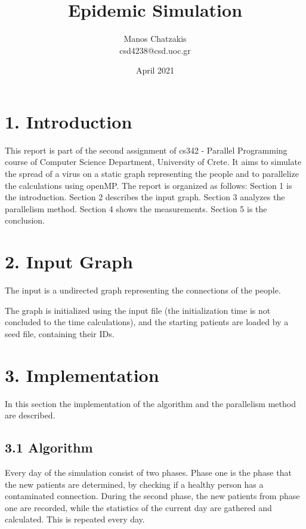 \documentclass{article}
\title{\vspace{-2.0cm}\textbf{Epidemic Simulation}}
\author{Manos Chatzakis\\csd4238@csd.uoc.gr}
\date{April 2021}
\begin{document}
\maketitle

\section*{1. Introduction}
This report is part of the second assignment of cs342 - Parallel Programming course of Computer Science Department, University of Crete. It aims to simulate the spread of a virus on a static graph representing the people and to parallelize the calculations using openMP. The report is organized as follows: Section 1 is the introduction. Section 2 describes the input graph.
Section 3 analyzes the parallelism method. Section 4 shows the measurements. Section 5 is the conclusion.

\section*{2. Input Graph}
The input is a undirected graph representing the connections of the people.
\begin{multicols}{3}

\end{multicols}
The graph is initialized using the input file (the initialization time is not concluded to the time calculations), and the starting patients are loaded by a seed file, containing their IDs.

\section*{3. Implementation}
In this section the implementation of the algorithm and the parallelism method are described.

\subsection*{3.1 Algorithm}
Every day of the simulation consist of two phases. Phase one is the phase that the new patients are determined, by checking if a healthy person has a contaminated connection. During the second phase, the new patients from phase one are recorded, while the statistics of the current day are gathered and calculated. This is repeated every day.
\end{document}
